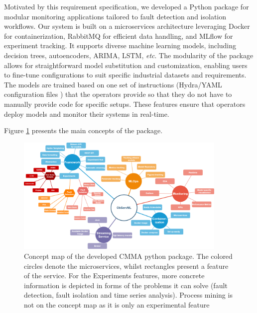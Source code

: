 \documentclass[preprint,12pt, a4paper]{elsarticle}
\begin{document}
Motivated by this requirement specification, we developed a Python package for modular monitoring applications tailored to fault detection and isolation workflows. Our system is built on a microservices architecture leveraging Docker for containerization, RabbitMQ for efficient data handling, and MLflow \citep{mlflow} for experiment tracking. It supports diverse machine learning models, including decision trees, autoencoders, ARIMA, LSTM, \textit{etc}. The modularity of the package allows for straightforward model substitution and customization, enabling users to fine-tune configurations to suit specific industrial datasets and requirements. The models are trained based on one set of instructions (Hydra/YAML configuration files \citep{Yadan2019Hydra}) that the operators provide so that they do not have to manually provide code for specific setups. These features ensure that operators deploy models and monitor their systems in real-time. 



\clearpage
Figure \ref{concept_map} presents the main concepts of the package.
\begin{figure}[h]
\centering
\includegraphics[width=0.9\textwidth, angle=90]{figs/concept_map.png}
\caption{Concept map of the developed CMMA python package. The colored circles denote the microservices, whilst rectangles present a feature of the service. For the Experiments features, more concrete information is depicted in forms of the problems it can solve (fault detection, fault isolation and time series analysis). Process mining is not on the concept map as it is only an experimental feature}
\label{concept_map}
\end{figure}
\end{document}
